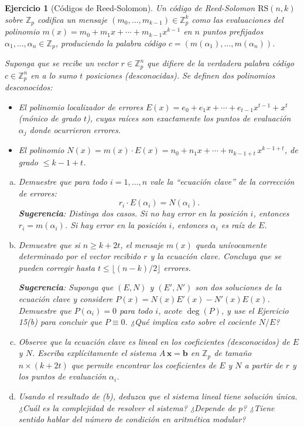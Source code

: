 \documentclass[12pt]{article}
\newtheorem{exercise}{Ejercicio}
\begin{document}
\begin{exercise}[Códigos de Reed-Solomon]
Un código de Reed-Solomon $\text{RS}(n,k)$ sobre $\mathbb{Z}_p$ codifica un mensaje $(m_0, \ldots, m_{k-1}) \in \mathbb{Z}_p^k$ como las evaluaciones del polinomio $m(x) = m_0 + m_1 x + \cdots + m_{k-1}x^{k-1}$ en $n$ puntos prefijados $\alpha_1, \ldots, \alpha_n \in \mathbb{Z}_p$, produciendo la palabra código $c = (m(\alpha_1), \ldots, m(\alpha_n))$. 

Suponga que se recibe un vector $r \in \mathbb{Z}_p^n$ que difiere de la verdadera palabra código $c \in \mathbb{Z}_p^n$ en a lo sumo $t$ posiciones (desconocidas). Se definen dos polinomios desconocidos:
\begin{itemize}
\item El polinomio localizador de errores $E(x) = e_0 + e_1 x + \cdots + e_{t-1}x^{t-1} + x^t$ (mónico de grado $t$), cuyas raíces son exactamente los puntos de evaluación $\alpha_j$ donde ocurrieron errores.
\item El polinomio $N(x) = m(x)\cdot E(x) = n_0 + n_1 x + \cdots + n_{k-1+t}\,x^{k-1+t}$, de grado $\leq k - 1 + t$.
\end{itemize}

\begin{enumerate}[(a)]
\item Demuestre que para todo $i = 1, \ldots, n$ vale la ``ecuación clave'' de la corrección de errores:
\[
r_i \cdot E(\alpha_i) = N(\alpha_i).
\]
\textbf{Sugerencia}: Distinga dos casos. Si no hay error en la posición $i$, entonces $r_i = m(\alpha_i)$. Si hay error en la posición $i$, entonces $\alpha_i$ es raíz de $E$.

\item Demuestre que si $n \geq k + 2t$, el mensaje $m(x)$ queda unívocamente determinado por el vector recibido $r$ y la ecuación clave. Concluya que se pueden corregir hasta $t \leq \lfloor(n-k)/2\rfloor$ errores.

\textbf{Sugerencia}: Suponga que $(E, N)$ y $(E', N')$ son dos soluciones de la ecuación clave y considere $P(x) = N(x)E'(x) - N'(x)E(x)$. Demuestre que $P(\alpha_i) = 0$ para todo $i$, acote $\deg(P)$, y use el Ejercicio 15(b) para concluir que $P \equiv 0$. ¿Qué implica esto sobre el cociente $N/E$?

\item Observe que la ecuación clave es lineal en los coeficientes (desconocidos) de $E$ y $N$. Escriba explícitamente el sistema $A\,\mathbf{x} = \mathbf{b}$ en $\mathbb{Z}_p$ de tamaño $n \times (k+2t)$ que permite encontrar los coeficientes de $E$ y $N$ a partir de $r$ y los puntos de evaluación $\alpha_i$. 

\item Usando el resultado de (b), deduzca que el sistema lineal tiene solución única. ¿Cuál es la complejidad de resolver el sistema? ¿Depende de $p$? ¿Tiene sentido hablar del número de condición en aritmética modular?
\end{enumerate}
\end{exercise}
\end{document}
